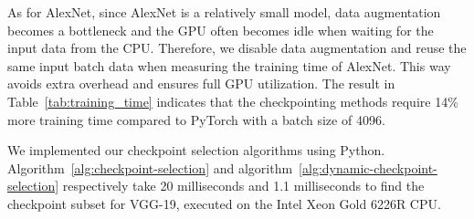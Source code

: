 As for AlexNet, since AlexNet is a relatively small model, data augmentation becomes a bottleneck and the GPU often becomes idle when waiting for the input data from the CPU.
Therefore, we disable data augmentation and reuse the same input batch data when measuring the training time of AlexNet.
This way avoids extra overhead and ensures full GPU utilization.
The result in Table~\ref{tab:training_time} indicates that the checkpointing methods require 14\% more training time compared to PyTorch with a batch size of 4096.


We implemented our checkpoint selection algorithms using Python. Algorithm~\ref{alg:checkpoint-selection} and algorithm~\ref{alg:dynamic-checkpoint-selection} respectively take 20 milliseconds and 1.1 milliseconds to find the checkpoint subset for VGG-19, executed on the Intel Xeon Gold 6226R CPU. 
